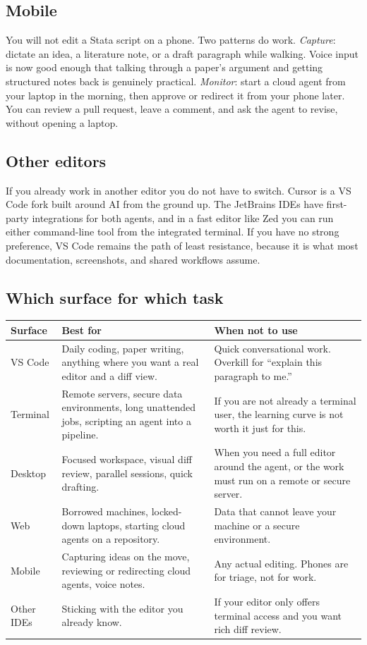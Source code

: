 \documentclass[11pt,a4paper]{article}
\begin{document}
\subsection{Mobile}

You will not edit a Stata script on a phone. Two patterns do work. \emph{Capture}:
dictate an idea, a literature note, or a draft paragraph while walking. Voice
input is now good enough that talking through a paper's argument and getting
structured notes back is genuinely practical. \emph{Monitor}: start a cloud agent
from your laptop in the morning, then approve or redirect it from your phone
later. You can review a pull request, leave a comment, and ask the agent to
revise, without opening a laptop.

\subsection{Other editors}

If you already work in another editor you do not have to switch. Cursor is a VS
Code fork built around AI from the ground up. The JetBrains IDEs have
first-party integrations for both agents, and in a fast editor like Zed you can
run either command-line tool from the integrated terminal. If you have no strong
preference, VS Code remains the path of least resistance, because it is what
most documentation, screenshots, and shared workflows assume.

\subsection{Which surface for which task}

\begin{longtable}{@{}p{2.4cm}p{5.3cm}p{5.3cm}@{}}
\toprule
\textbf{Surface} & \textbf{Best for} & \textbf{When not to use} \\
\midrule
\endhead
VS Code &
Daily coding, paper writing, anything where you want a real editor and a diff
view. &
Quick conversational work. Overkill for ``explain this paragraph to me.'' \\
\addlinespace
Terminal &
Remote servers, secure data environments, long unattended jobs, scripting an
agent into a pipeline. &
If you are not already a terminal user, the learning curve is not worth it just
for this. \\
\addlinespace
Desktop &
Focused workspace, visual diff review, parallel sessions, quick drafting. &
When you need a full editor around the agent, or the work must run on a remote
or secure server. \\
\addlinespace
Web &
Borrowed machines, locked-down laptops, starting cloud agents on a repository. &
Data that cannot leave your machine or a secure environment. \\
\addlinespace
Mobile &
Capturing ideas on the move, reviewing or redirecting cloud agents, voice notes. &
Any actual editing. Phones are for triage, not for work. \\
\addlinespace
Other IDEs &
Sticking with the editor you already know. &
If your editor only offers terminal access and you want rich diff review. \\
\bottomrule
\end{longtable}
\end{document}
